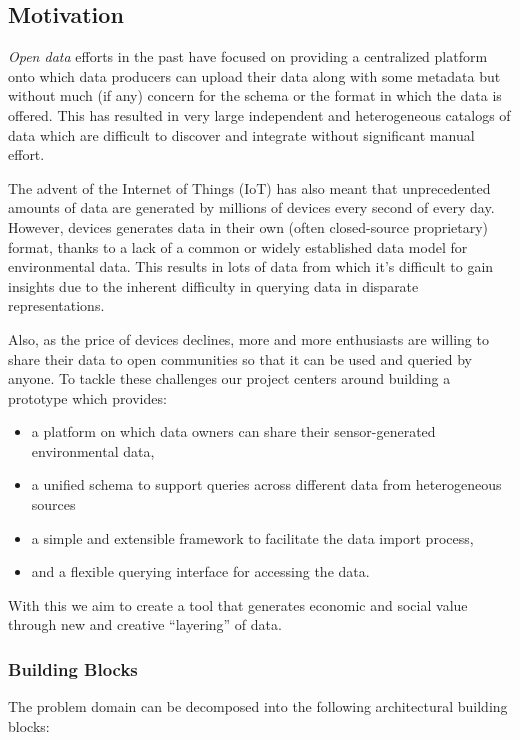 \subsection{Motivation}\label{motivation}

\emph{Open data} efforts in the past have focused on providing a
centralized platform onto which data producers can upload their data
along with some metadata but without much (if any) concern for the
schema or the format in which the data is offered. This has resulted in
very large independent and heterogeneous catalogs of data which are
difficult to discover and integrate without significant manual effort.

The advent of the Internet of Things (IoT) has also meant that
unprecedented amounts of data are generated by millions of devices every
second of every day. However, devices generates data in their own (often
closed-source proprietary) format, thanks to a lack of a common or
widely established data model for environmental data. This results in
lots of data from which it's difficult to gain insights due to the
inherent difficulty in querying data in disparate representations.

Also, as the price of devices declines, more and more enthusiasts are
willing to share their data to open communities so that it can be used
and queried by anyone. To tackle these challenges our project centers
around building a prototype which provides:

\begin{itemize}
\tightlist
\item
  a platform on which data owners can share their sensor-generated
  environmental data,
\item
  a unified schema to support queries across different data from
  heterogeneous sources
\item
  a simple and extensible framework to facilitate the data import
  process,
\item
  and a flexible querying interface for accessing the data.
\end{itemize}

With this we aim to create a tool that generates economic and social
value through new and creative ``layering'' of data.

\subsubsection{Building Blocks}\label{building-blocks}

The problem domain can be decomposed into the following architectural
building blocks:

